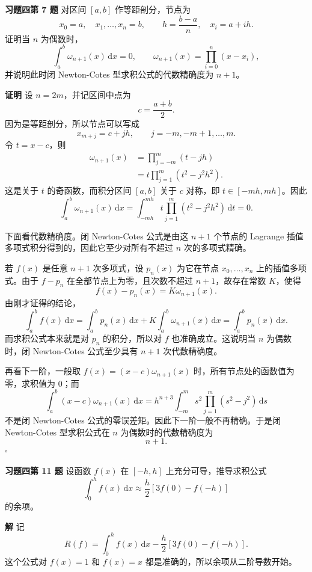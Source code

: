 \documentclass[UTF8,a4paper,11pt]{ctexart}
\newcommand{\dd}{\,\mathrm{d}}
\newcommand{\QED}{\hfill$\square$}
\begin{document}
\bigskip\bigskip

\noindent\textbf{习题四\quad 第 7 题}\quad
对区间 $[a,b]$ 作等距剖分，节点为
\[
  x_0=a,\quad x_1,\ldots,x_n=b,\qquad
  h=\frac{b-a}{n},\quad x_i=a+ih.
\]
证明当 $n$ 为偶数时，
\[
  \int_a^b \omega_{n+1}(x)\dd x=0,\qquad
  \omega_{n+1}(x)=\prod_{i=0}^{n}(x-x_i),
\]
并说明此时闭 Newton-Cotes 型求积公式的代数精确度为 $n+1$。

\medskip
\noindent\textbf{证明}\quad
设 $n=2m$，并记区间中点为
\[
  c=\frac{a+b}{2}.
\]
因为是等距剖分，所以节点可以写成
\[
  x_{m+j}=c+jh,\qquad j=-m,-m+1,\ldots,m.
\]
令 $t=x-c$，则
\[
\begin{aligned}
  \omega_{n+1}(x)
  &=\prod_{j=-m}^{m}(t-jh)  \\
  &=t\prod_{j=1}^{m}(t^2-j^2h^2).
\end{aligned}
\]
这是关于 $t$ 的奇函数，而积分区间 $[a,b]$ 关于 $c$ 对称，即 $t\in[-mh,mh]$。因此
\[
  \int_a^b\omega_{n+1}(x)\dd x
  =\int_{-mh}^{mh}t\prod_{j=1}^{m}(t^2-j^2h^2)\dd t=0.
\]

下面看代数精确度。闭 Newton-Cotes 公式是由这 $n+1$ 个节点的 Lagrange 插值多项式积分得到的，因此它至少对所有不超过 $n$ 次的多项式精确。

若 $f(x)$ 是任意 $n+1$ 次多项式，设 $p_n(x)$ 为它在节点 $x_0,\ldots,x_n$ 上的插值多项式。由于 $f-p_n$ 在全部节点上为零，且次数不超过 $n+1$，故存在常数 $K$，使得
\[
  f(x)-p_n(x)=K\omega_{n+1}(x).
\]
由刚才证得的结论，
\[
  \int_a^b f(x)\dd x
  =\int_a^b p_n(x)\dd x+K\int_a^b\omega_{n+1}(x)\dd x
  =\int_a^b p_n(x)\dd x.
\]
而求积公式本来就是对 $p_n$ 的积分，所以对 $f$ 也准确成立。这说明当 $n$ 为偶数时，闭 Newton-Cotes 公式至少具有 $n+1$ 次代数精确度。

再看下一阶，一般取 $f(x)=(x-c)\omega_{n+1}(x)$ 时，所有节点处的函数值为零，求积值为 $0$；而
\[
  \int_a^b (x-c)\omega_{n+1}(x)\dd x
  =h^{n+3}\int_{-m}^{m}s^2\prod_{j=1}^{m}(s^2-j^2)\dd s
\]
不是闭 Newton-Cotes 公式的零误差矩。因此下一阶一般不再精确。于是闭 Newton-Cotes 型求积公式在 $n$ 为偶数时的代数精确度为
\[
  \boxed{n+1.}
\]
\QED

\bigskip\bigskip

\noindent\textbf{习题四\quad 第 11 题}\quad
设函数 $f(x)$ 在 $[-h,h]$ 上充分可导，推导求积公式
\[
  \int_0^h f(x)\dd x\approx \frac h2[3f(0)-f(-h)]
\]
的余项。

\medskip
\noindent\textbf{解}\quad
记
\[
  R(f)=\int_0^h f(x)\dd x-\frac h2[3f(0)-f(-h)].
\]
这个公式对 $f(x)=1$ 和 $f(x)=x$ 都是准确的，所以余项从二阶导数开始。
\end{document}
